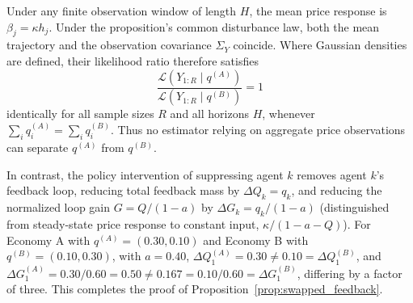 \documentclass[10pt,twocolumn,letterpaper]{article}
\theoremstyle{definition}
\theoremstyle{remark}
\begin{document}
Under any finite observation window of length $H$, the mean price response is $\beta_j=\kappa h_j$. Under the proposition's common disturbance law, both the mean trajectory and the observation covariance $\Sigma_Y$ coincide. Where Gaussian densities are defined, their likelihood ratio therefore satisfies
\begin{equation}
 \frac{\mathcal L(Y_{1:R} \mid q^{(A)})}{\mathcal L(Y_{1:R} \mid q^{(B)})}=1
\end{equation}
identically for all sample sizes $R$ and all horizons $H$, whenever $\sum_i q_i^{(A)}=\sum_i q_i^{(B)}$. Thus no estimator relying on aggregate price observations can separate $q^{(A)}$ from $q^{(B)}$.

In contrast, the policy intervention of suppressing agent $k$ removes agent $k$'s feedback loop, reducing total feedback mass by $\Delta Q_k = q_k$, and reducing the normalized loop gain $G = Q / (1 - a)$ by $\Delta G_k = q_k / (1 - a)$ (distinguished from steady-state price response to constant input, $\kappa / (1 - a - Q)$). For Economy A with $q^{(A)}=(0.30,0.10)$ and Economy B with $q^{(B)}=(0.10,0.30)$, with $a = 0.40$, $\Delta Q_1^{(A)} = 0.30 \ne 0.10 = \Delta Q_1^{(B)}$, and $\Delta G_1^{(A)} = 0.30 / 0.60 = 0.50 \ne 0.167 = 0.10 / 0.60 = \Delta G_1^{(B)}$, differing by a factor of three. This completes the proof of Proposition~\ref{prop:swapped_feedback}.
\end{document}
